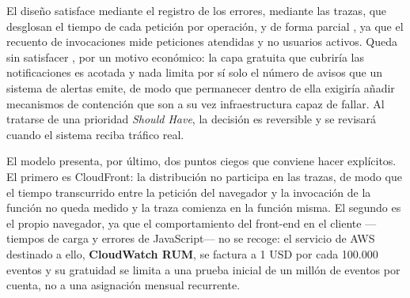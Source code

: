 El diseño satisface  mediante el registro de los errores,  mediante las trazas, que desglosan el tiempo de cada petición por operación, y de forma parcial , ya que el recuento de invocaciones mide peticiones atendidas y no usuarios activos. Queda sin satisfacer , por un motivo económico: la capa gratuita que cubriría las notificaciones es acotada y nada limita por sí solo el número de avisos que un sistema de alertas emite, de modo que permanecer dentro de ella exigiría añadir mecanismos de contención que son a su vez infraestructura capaz de fallar. Al tratarse de una prioridad \textit{Should Have}, la decisión es reversible y se revisará cuando el sistema reciba tráfico real.

El modelo presenta, por último, dos puntos ciegos que conviene hacer explícitos. El primero es CloudFront: la distribución no participa en las trazas, de modo que el tiempo transcurrido entre la petición del navegador y la invocación de la función no queda medido y la traza comienza en la función misma. El segundo es el propio navegador, ya que el comportamiento del front-end en el cliente —tiempos de carga y errores de JavaScript— no se recoge: el servicio de AWS destinado a ello, \textbf{CloudWatch RUM}, se factura a 1 USD por cada 100.000 eventos y su gratuidad se limita a una prueba inicial de un millón de eventos por cuenta, no a una asignación mensual recurrente.
